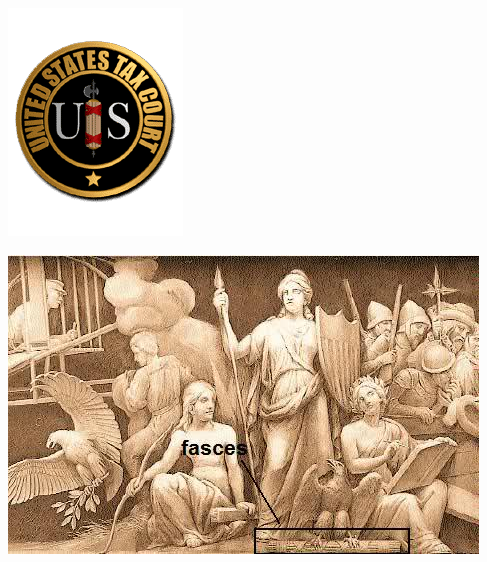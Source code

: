 \begin{frame}
    \centering
    \includegraphics[width=.9\textwidth]{img/fasces/tax-court.png} \\
\end{frame}
\begin{frame}
    \centering
    \includegraphics[width=.9\textwidth]{img/fasces/teut1.jpg} \\
\end{frame}
